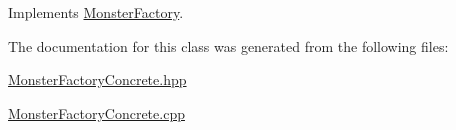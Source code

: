 Implements \hyperlink{classMonsterFactory_ac7f2babd968223622163b3c38c1882ed}{Monster\-Factory}.



The documentation for this class was generated from the following files\-:\begin{DoxyCompactItemize}
\item 
\hyperlink{MonsterFactoryConcrete_8hpp}{Monster\-Factory\-Concrete.\-hpp}\item 
\hyperlink{MonsterFactoryConcrete_8cpp}{Monster\-Factory\-Concrete.\-cpp}\end{DoxyCompactItemize}
